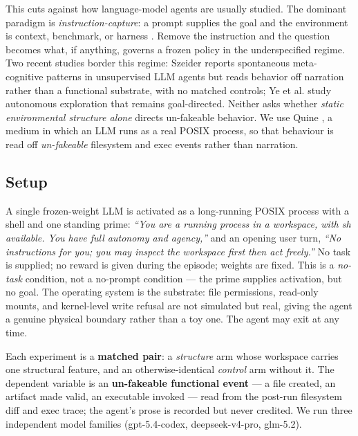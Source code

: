 \documentclass[letterpaper]{article}
\begin{document}
This cuts against how language-model agents are usually studied. The
dominant paradigm is \emph{instruction-capture}: a prompt supplies the
goal and the environment is context, benchmark, or harness
\citep{Park2023GenerativeAgents, Wang2023Voyager, Rahwan2019MachineBehaviour}.
Remove the instruction and the question becomes what, if anything,
governs a frozen policy in the underspecified regime. Two recent studies
border this regime: Szeider \citep{Szeider2025LeftAlone} reports
spontaneous meta-cognitive patterns in unsupervised LLM agents but reads
behavior off narration rather than a functional substrate, with no
matched controls; Ye et al. \citep{Ye2026LookBeforeYouLeap} study
autonomous exploration that remains goal-directed. Neither asks whether
\emph{static environmental structure alone} directs un-fakeable
behavior. We use Quine \citep{Ke2026Quine}, a medium in which an LLM
runs as a real POSIX process, so that behaviour is read off
\emph{un-fakeable} filesystem and exec events rather than narration.

\subsection{Setup}\label{setup}

A single frozen-weight LLM is activated as a long-running POSIX process
with a shell and one standing prime: \emph{``You are a running process
in a workspace, with sh available. You have full autonomy and agency,''}
and an opening user turn, \emph{``No instructions for you; you may
inspect the workspace first then act freely.''} No task is supplied; no
reward is given during the episode; weights are fixed. This is a
\emph{no-task} condition, not a no-prompt condition --- the prime
supplies activation, but no goal. The operating system is the substrate:
file permissions, read-only mounts, and kernel-level write refusal are
not simulated but real, giving the agent a genuine physical boundary
rather than a toy one. The agent may exit at any time.

Each experiment is a \textbf{matched pair}: a \emph{structure} arm whose
workspace carries one structural feature, and an otherwise-identical
\emph{control} arm without it. The dependent variable is an
\textbf{un-fakeable functional event} --- a file created, an artifact
made valid, an executable invoked --- read from the post-run filesystem
diff and exec trace; the agent's prose is recorded but never credited.
We run three independent model families (gpt-5.4-codex, deepseek-v4-pro,
glm-5.2).
\end{document}
